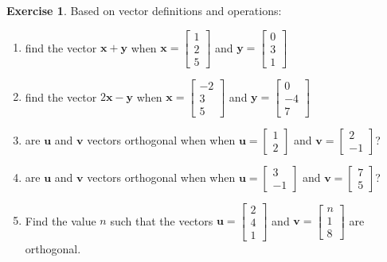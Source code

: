 \documentclass[
]{book}
\theoremstyle{definition}
\theoremstyle{definition}
\theoremstyle{definition}
\newtheorem{exercise}{Exercise}[chapter]
\theoremstyle{remark}
\begin{document}
\begin{exercise}
\protect\hypertarget{exr:m-vectors}{}{\label{exr:m-vectors} }Based on vector definitions and operations:

\begin{enumerate}
\def\labelenumi{\alph{enumi})}
\item
  find the vector \(\mathbf{x} + \mathbf{y}\) when \(\mathbf{x} =\begin{bmatrix}  1 \\  2 \\  5 \end{bmatrix}\) and \(\mathbf{y} =\begin{bmatrix}  0\\  3 \\  1  \end{bmatrix}\)
\item
  find the vector \(2\mathbf{x} - \mathbf{y}\) when \(\mathbf{x} =\begin{bmatrix}  -2 \\  3 \\  5 \end{bmatrix}\) and \(\mathbf{y} =\begin{bmatrix}  0\\  -4 \\  7  \end{bmatrix}\)
\item
  are \(\mathbf{u}\) and \(\mathbf{v}\) vectors orthogonal when when \(\mathbf{u} =\begin{bmatrix}  1 \\  2 \end{bmatrix}\) and \(\mathbf{v} =\begin{bmatrix}  2\\  -1  \end{bmatrix}\)?
\item
  are \(\mathbf{u}\) and \(\mathbf{v}\) vectors orthogonal when when \(\mathbf{u} =\begin{bmatrix}  3 \\  -1 \end{bmatrix}\) and \(\mathbf{v} =\begin{bmatrix}  7\\  5  \end{bmatrix}\)?
\item
  Find the value \(n\) such that the vectors \(\mathbf{u} =\begin{bmatrix}  2 \\  4 \\  1 \end{bmatrix}\) and \(\mathbf{v} =\begin{bmatrix}  n\\  1 \\  8  \end{bmatrix}\) are orthogonal.
\end{enumerate}
\end{exercise}
\end{document}
